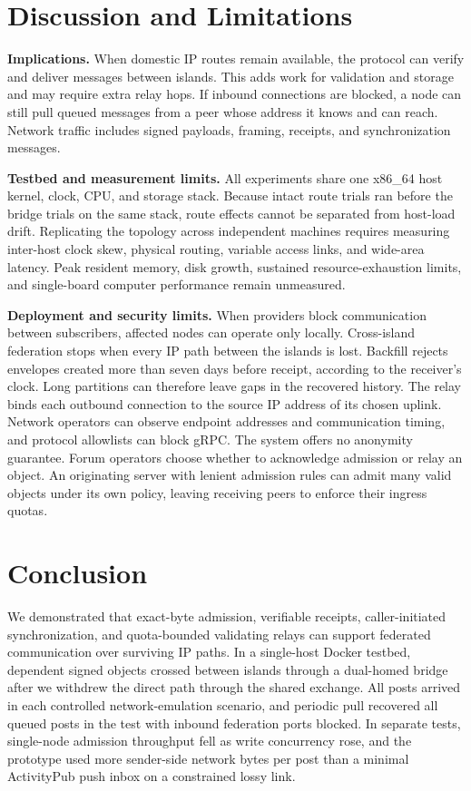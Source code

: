 \documentclass[conference,a4paper,10pt]{IEEEtran}
\begin{document}
\section{Discussion and Limitations}
\label{sec:limits}

\textbf{Implications.} When domestic IP routes remain available, the protocol can verify and deliver messages between islands. This adds work for validation and storage and may require extra relay hops. If inbound connections are blocked, a node can still pull queued messages from a peer whose address it knows and can reach. Network traffic includes signed payloads, framing, receipts, and synchronization messages.

\textbf{Testbed and measurement limits.} All experiments share one x86\_64 host kernel, clock, CPU, and storage stack. Because intact route trials ran before the bridge trials on the same stack, route effects cannot be separated from host-load drift. Replicating the topology across independent machines requires measuring inter-host clock skew, physical routing, variable access links, and wide-area latency. Peak resident memory, disk growth, sustained resource-exhaustion limits, and single-board computer performance remain unmeasured.

\textbf{Deployment and security limits.} When providers block communication between subscribers, affected nodes can operate only locally. Cross-island federation stops when every IP path between the islands is lost. Backfill rejects envelopes created more than seven days before receipt, according to the receiver's clock. Long partitions can therefore leave gaps in the recovered history. The relay binds each outbound connection to the source IP address of its chosen uplink. Network operators can observe endpoint addresses and communication timing, and protocol allowlists can block gRPC. The system offers no anonymity guarantee. Forum operators choose whether to acknowledge admission or relay an object. An originating server with lenient admission rules can admit many valid objects under its own policy, leaving receiving peers to enforce their ingress quotas.

\section{Conclusion}

We demonstrated that exact-byte admission, verifiable receipts, caller-initiated synchronization, and quota-bounded validating relays can support federated communication over surviving IP paths. In a single-host Docker testbed, dependent signed objects crossed between islands through a dual-homed bridge after we withdrew the direct path through the shared exchange. All posts arrived in each controlled network-emulation scenario, and periodic pull recovered all queued posts in the test with inbound federation ports blocked. In separate tests, single-node admission throughput fell as write concurrency rose, and the prototype used more sender-side network bytes per post than a minimal ActivityPub push inbox on a constrained lossy link.



\end{document}

